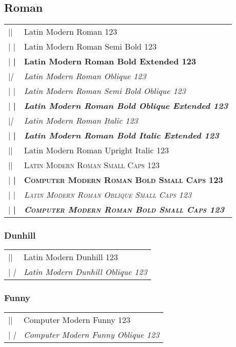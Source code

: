 \documentclass{article}
\makeatletter
\newenvironment{vrb}{\begin{tabular}{@{}p{5cm}l@{}}}{\end{tabular}}
\makeatother
\begin{document}
\subsection*{Roman}

\rmfamily
\begin{vrb}
|\rmfamily| & {Latin Modern Roman 123} \\
|  \sbweight| & {\sbweight Latin Modern Roman Semi Bold 123} \\
|  \bfseries| & {\bfseries Latin Modern Roman Bold Extended 123} \\
|\slshape| & {\slshape Latin Modern Roman Oblique 123} \\
|  \sbweight| & {\sbweight\slshape Latin Modern Roman Semi Bold Oblique 123} \\
|  \bfseries| & {\bfseries\slshape Latin Modern Roman Bold Oblique Extended 123} \\
|\itshape| & {\itshape Latin Modern Roman Italic 123} \\
|  \bfseries| & {\bfseries\itshape Latin Modern Roman Bold Italic Extended 123} \\
|\uishape| & {\uishape Latin Modern Roman Upright Italic 123} \\
|\scshape| & {\scshape Latin Modern Roman Small Caps 123} \\
|  \bfseries| & {\bfseries\scshape Computer Modern Roman Bold Small Caps 123} \\
|  \sishape| & {\scshape\slshape Latin Modern Roman Oblique Small Caps 123} \\
|    \bfseries| & {\slshape\bfseries\scshape Computer Modern Roman Bold Small Caps 123} \\
\end{vrb}

\subsubsection*{Dunhill}

\tistyle
\begin{vrb}
|\tistyle | & {Latin Modern Dunhill 123} \\
|  \slshape| & {\slshape Latin Modern Dunhill Oblique 123} \\
\end{vrb}

\subsubsection*{Funny}

\selectfont
\begin{vrb}
|\fontfamily{cmfr}\selectfont | & {Computer Modern Funny 123} \\
|  \itshape| & {\itshape Computer Modern Funny Oblique 123} \\
\end{vrb}
\end{document}
